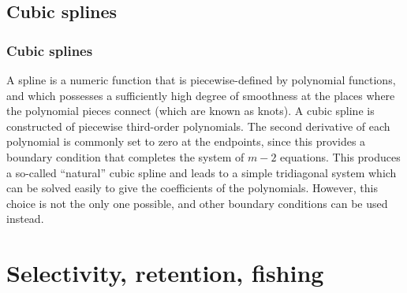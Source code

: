 \documentclass{beamer}
\begin{document}

\subsection{Cubic splines}
\begin{frame}
\frametitle{Cubic splines}
A spline is a numeric function that is piecewise-defined by polynomial
functions, and which possesses a sufficiently high degree of smoothness at the
places where the polynomial pieces connect (which are known as knots). A cubic
spline is constructed of piecewise third-order polynomials. The second
derivative of each polynomial is commonly set to zero at the endpoints, since
this provides a boundary condition that completes the system of $m-2$
equations. This produces a so-called ``natural'' cubic spline and leads to a
simple tridiagonal system which can be solved easily to give the coefficients of
the polynomials. However, this choice is not the only one possible, and other
boundary conditions can be used instead.
\end{frame}


\section{Selectivity, retention, fishing}

\end{document}
